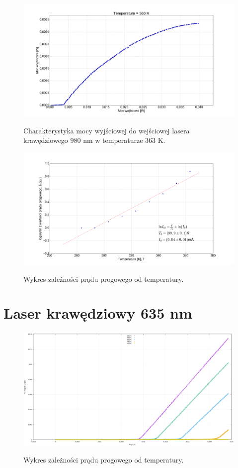 \documentclass[a4paper, portrait,12pt]{report}
\begin{document}
\begin{figure}
\center
  \includegraphics[scale=0.30]{plot980/temp_90_power.png}
  \label{rys1}
  \caption{Charakterystyka mocy wyjściowej do wejściowej lasera krawędziowego 980 nm w temperaturze 363 K.} 
\end{figure}






\begin{figure}
\center
  \includegraphics[scale=0.30]{plot980/fit_i_th.png}
  \label{rys1}
  \caption{Wykres zależności prądu progowego od temperatury.} 
\end{figure}

\newpage
\section{Laser krawędziowy 635 nm}

\begin{figure}
\center
  \includegraphics[scale=0.30]{plot635/plot_all.png}
  \label{rys1}
  \caption{Wykres zależności prądu progowego od temperatury.} 
\end{figure}
\end{document}
